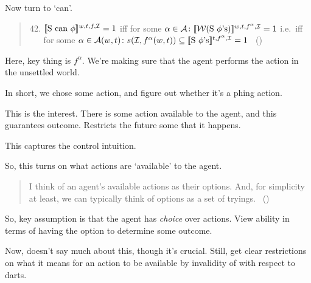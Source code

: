 \begin{note}
  Now turn to `can'.

  \begin{quote}
    \begin{enumerate}
      \setcounter{enumi}{41}
    \item
      \(\sem[w,t,f,\mathcal{I}]{\text{S can }\phi} = 1\) iff for some \(\alpha \in \mathcal{A}\colon \sem[w,t,f^{\alpha},\mathcal{I}]{\mathcal{W}(\text{S }\phi\text{'s})} = 1\)\newline
      i.e.\ iff for some \(\alpha \in \mathcal{A}(w,t)\colon s(\mathcal{I}, f^{\alpha}(w,t)) \subseteq \sem[t,f^{\alpha},\mathcal{I}]{\text{S }\phi\text{'s}} = 1\)\newline
      \mbox{ }\hfill\mbox{(\citeyear[16]{Boylan:2020aa})}
    \end{enumerate}
  \end{quote}
  Here, key thing is \(f^{\alpha}\).
  We're making sure that the agent performs the action in the unsettled world.

  In short, we chose some action, and figure out whether it's a phing action.

  This is the interest.
  There is some action available to the agent, and this guarantees outcome.
  Restricts the future some that it happens.

  This captures the control intuition.

  So, this turns on what actions are `available' to the agent.
  \begin{quote}
    I think of an agent's available actions as their options.
    And, for simplicity at least, we can typically think of options as a set of tryings.\newline
    \mbox{ }\hfill\mbox{(\citeyear[14]{Boylan:2020aa})}
  \end{quote}

  So, key assumption is that the agent has \emph{choice} over actions.
  View ability in terms of having the option to determine some outcome.

  Now, \citeauthor{Boylan:2020aa} doesn't say much about this, though it's crucial.
  Still, get clear restrictions on what it means for an action to be available by invalidity of \BoyVS{} with respect to darts.
\end{note}


